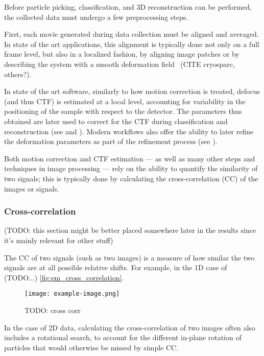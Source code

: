 Before particle picking, classification, and 3D reconstruction can be performed, the collected data must undergo a few preprocessing steps.

First, each movie generated during data collection must be aligned and averaged.
In state of the art applications, this alignment is typically done not only on a full frame level, but also in a localized fashion, by aligning image patches or by describing the system with a smooth deformation field~\cite{zhengMotionCor2AnisotropicCorrection2017} (CITE cryosparc, others?).

In state of the art software, similarly to how motion correction is treated, defocus (and thus CTF) is estimated at a local level, accounting for variability in the positioning of the sample with respect to the detector.
The parameters thus obtained are later used to correct for the CTF during classification and reconstruction (see  and ).
Modern workflows also offer the ability to later refine the deformation parameters as part of the refinement process (see ).

Both motion correction and CTF estimation --- as well as many other steps and techniques in image processing --- rely on the ability to quantify the similarity of two signals; this is typically done by calculating the cross-correlation (CC) of the images or signals.

\subsubsection{Cross-correlation}\label{em_cross_correlation}

(TODO: this section might be better placed somewhere later in the results since it's mainly relevant for other stuff)

The CC of two signals (such as two images) is a measure of how similar the two signals are at all possible relative shifts. For example, in the 1D case of (TODO...) \autoref{fig:em_cross_correlation}.

\begin{figure}[ht]
    \centering
    \texttt{[image: example-image.png]}
    \caption{TODO: cross corr}
    \label{fig:em_cross_correlation}
\end{figure}

In the case of 2D data, calculating the cross-correlation of two images often also includes a rotational search, to account for the different in-plane rotation of particles that would otherwise be missed by simple CC.

